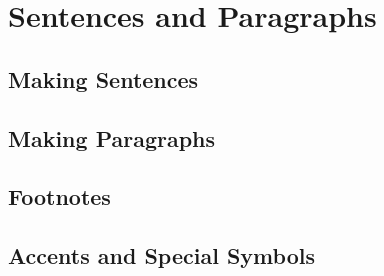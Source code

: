 \section{Sentences and Paragraphs}
\subsection{Making Sentences}


\subsection{Making Paragraphs}


\subsection{Footnotes}


\subsection{Accents and Special Symbols}